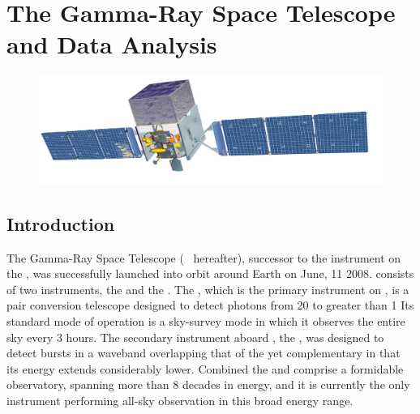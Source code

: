 \chapter{The \Fermi{ }Gamma-Ray Space Telescope and \gam{} Data Analysis}
\label{chap:FGST}

\begin{figure}[ht!]
	\centering
	\includegraphics[width=1.0\columnwidth]{Figures/Fermi_telescope_illustration_01.jpg}
	\label{fig:fermi}
\end{figure}

\section{\label{FGST:intro}Introduction}
The \Fermi{} Gamma-Ray Space Telescope (\Fermi{} ~hereafter), successor to the \egret{} instrument on the \cgro{}, was successfully launched into orbit around Earth on June, 11 2008. \Fermi{} consists of two instruments, the \lat{} and the \gbm{}. The \lat{}, which is the primary instrument on \Fermi{}, is a pair conversion telescope designed to detect photons from 20\mev{} to greater than 1\tev{} \citep{atwood09, lat_perf, 2FHL} Its standard mode of operation is a sky-survey mode in which it observes the entire sky every 3 hours. The secondary instrument aboard \Fermi{}, the \gbm{}, was designed to detect \gam{} bursts in a waveband overlapping that of the \lat{} yet complementary in that its energy extends considerably lower. Combined the \lat{} and \gbm{} comprise a formidable observatory, spanning more than 8 decades in energy, and it is currently the only instrument performing all-sky observation in this broad energy range. 

